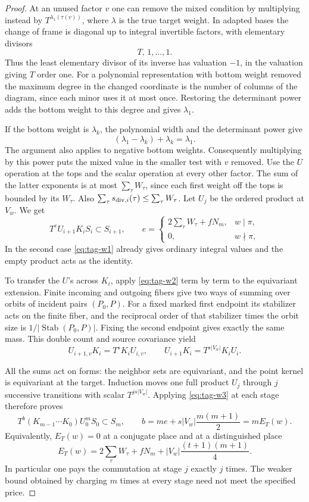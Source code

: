 \begin{proof}
At an unused factor \(v\) one can remove the mixed condition
by multiplying instead by \(T^{\lambda_1(\tau(v))}\), where
\(\lambda\) is the true target weight. In adapted bases the change of frame is diagonal up to integral invertible factors, with elementary divisors
\[
  T,\,1,\ldots,1.
\]
Thus the least elementary divisor of its inverse has valuation \(-1\), in the valuation giving \(T\) order one. For a
polynomial representation with bottom weight removed the
maximum degree in the changed coordinate is the number of
columns of the diagram, since each minor uses it at most once.
Restoring the determinant power adds the bottom weight to this
degree and gives \(\lambda_1\).

If the bottom weight is \(\lambda_k\), the polynomial width and the determinant power give
\[
  (\lambda_1-\lambda_k)+\lambda_k=\lambda_1 .
\]
 The argument also applies to
negative bottom weights. Consequently multiplying by this power
puts the mixed value in the smaller test with \(v\) removed.
Use the \(U\) operation at the tops and the scalar operation at
every other factor. The sum of the latter exponents is at most
\(\sum_\tau W_\tau\), since each first weight off the tops is
bounded by its \(W_\tau\). Also
\(\sum_\tau s_{{\rm div},i}(\tau)\le\sum_\tau W_\tau\).
Let \(U_j\) be the ordered product at \(V_w\). We get
\[
 T^{e} U_{i+1}K_i S_i\subset S_{i+1},\qquad
 e=\begin{cases}
       2\sum_\tau W_\tau+fN_m,&w\mid\pi,\\
       0,&w\nmid\pi ,
     \end{cases}                                                  \tag{W3}\label{eq:tag-w3}
\]
In the second
case \eqref{eq:tag-w1} already gives ordinary integral values and the empty
product acts as the identity.

To transfer the \(U\)'s across \(K_i\), apply \eqref{eq:tag-w2} term by term
to the equivariant extension. Finite incoming and outgoing
fibers give two ways of summing over orbits of incident pairs
\((P_0,P)\). For a fixed marked first endpoint its stabilizer
acts on the finite fiber, and the reciprocal order of that
stabilizer times the orbit size is
\(1/|\operatorname{Stab}(P_0,P)|\). Fixing the second endpoint
gives exactly the same mass. This double count and source
covariance yield
\[
 U_{i+1,v} K_i=T^s K_i U_{i,v},\qquad
 U_{i+1}K_i=T^{s|V_w|}K_i U_i .                                 \tag{W4}\label{eq:tag-w4}
\]

All the sums act on forms: the neighbor sets are equivariant,
and the point kernel is equivariant at the target. Induction
moves one full product \(U_j\) through \(j\) successive
transitions with scalar \(T^{js|V_w|}\). Applying \eqref{eq:tag-w3} at each
stage therefore proves
\[
 T^{b}(K_{m-1}\cdots K_0)U_0^m S_0\subset S_m,\qquad
 b=me+s|V_w|\frac{m(m+1)}2=m E_T(w).                              \tag{W5}\label{eq:tag-w5}
\]
Equivalently, \(E_T(w)=0\) at a conjugate place and at a
distinguished place
\[
 E_T(w)=2\sum_\tau W_\tau+fN_m+
             |V_w|\frac{(t+1)(m+1)}{4}.
\]
In particular one pays the commutation at stage \(j\) exactly
\(j\) times. The weaker bound obtained by charging \(m\) times
at every stage need not meet the specified price.


\end{proof}
